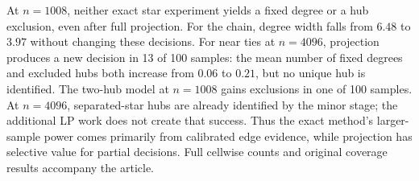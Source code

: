 At $n=1008$, neither exact star experiment yields a fixed degree or a hub exclusion, even after full projection. For the chain, degree width falls from $6.48$ to $3.97$ without changing these decisions. For near ties at $n=4096$, projection produces a new decision in 13 of 100 samples: the mean number of fixed degrees and excluded hubs both increase from $0.06$ to $0.21$, but no unique hub is identified. The two-hub model at $n=1008$ gains exclusions in one of 100 samples. At $n=4096$, separated-star hubs are already identified by the minor stage; the additional LP work does not create that success. Thus the exact method's larger-sample power comes primarily from calibrated edge evidence, while projection has selective value for partial decisions. Full cellwise counts and original coverage results accompany the article.
